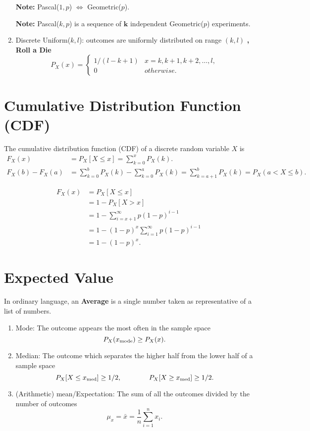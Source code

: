 \begin{enumerate}
{        \textbf{Note:} Pascal($1, p$) $\iff$ Geometric($p$).

        \textbf{Note:} Pascal($k, p$) is a sequence of $\mathbf{k}$ independent Geometric($p$) experiments.
    }
    \item Discrete Uniform($k, l$): outcomes are uniformly distributed on range $(k, l)$ \textbf{\ie, Roll a Die}{
        \[ P_X(x) =
        \begin{cases}
            1/(l-k+1)   & x=k,k+1,k+2,\ldots,l, \\
            0   & otherwise.
        \end{cases} \]
    }
\end{enumerate}

\section{Cumulative Distribution Function (CDF)}
\begin{definition}
    The cumulative distribution function (CDF) of a discrete random variable $X$ is
    \begin{align*}
        F_X(x)&=P_X[X\leq x]=\sum_{k=0}^{x}P_X(k). \\
        F_X(b)-F_X(a)&=\sum_{k=0}^{b}P_X(k)-\sum_{k=0}^{a}P_X(k)=\sum_{k=a+1}^{b}P_X(k)=P_X(a<X\leq b).
    \end{align*}
\end{definition}

\begin{theorem}
    \begin{align*}
        F_X(x)
        &= P_X[X\leq x] \\
        &= 1-P_X[X > x] \\
        &= 1-\sum_{i=x+1}^{\infty}p(1-p)^{i-1} \\
        &= 1-(1-p)^x\sum_{i=1}^{\infty}p(1-p)^{i-1} \\
        &= 1-(1-p)^x.
    \end{align*}
\end{theorem}

\section{Expected Value}
\begin{definition}
    [Average]
    In ordinary language, an \textbf{Average} is a single number taken as representative of a list of numbers.
    \begin{enumerate}
        \item Mode: The outcome appears the most often in the sample space \[P_X(x_{\textnormal{mode}})\geq P_X(x).\]
        \item Median: The outcome which separates the higher half from  the lower half of a sample space \[P_X[X \leq x_{\textnormal{med}}] \geq 1/2, \qquad \qquad P_X[X \geq x_{\textnormal{med}}] \geq 1/2.\]
        \item (Arithmetic) mean/Expectation:  The sum of all the outcomes divided by the number of outcomes \[\mu_x = \bar{x} = \frac{1}{n}\sum_{i=1}^{n}x_i.\]
    \end{enumerate}
\end{definition}

